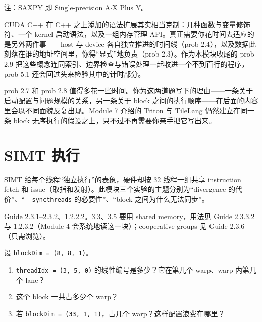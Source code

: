 \documentclass[11pt,a4paper,fontset=none]{ctexart}
\begin{document}
注：SAXPY 即 Single-precision A$\cdot$X Plus Y。

\begin{lookback}
CUDA C++ 在 C++ 之上添加的语法扩展其实相当克制：几种函数与变量修饰符、一个 kernel 启动语法，以及一组内存管理 API。真正需要你花时间去适应的是另外两件事——host 与 device 各自独立推进的时间线（prob 2.4），以及数据此刻落在谁的地址空间里，你得“显式”地负责（prob 2.3）。作为本模块收尾的 prob 2.9 把这些概念连同索引、边界检查与错误处理一起收进一个不到百行的程序，prob 5.1 还会回过头来检验其中的计时部分。

prob 2.7 和 prob 2.8 值得多花一些时间。你为这两道题写下的理由——一条关于启动配置与问题规模的关系，另一条关于 block 之间的执行顺序——在后面的内容里会以不同面貌反复出现。Module 7 介绍的 Triton 与 TileLang 仍然建立在同一条 block 无序执行的假设之上，只不过不再需要你亲手把它写出来。
\end{lookback}

\section{SIMT 执行}

SIMT 给每个线程“独立执行”的表象，硬件却按 32 线程一组共享 instruction fetch 和 issue（取指和发射）。此模块三个实验的主题分别为“divergence 的代价”、“\texttt{\_\_syncthreads} 的必要性”、“block 之间为什么无法同步”。

\begin{reading}
Guide 2.3.1--2.3.2、1.2.2.2。3.3、3.5 要用 shared memory，用法见 Guide 2.3.3.2 与 1.2.3.2（Module 4 会系统地读这一块）；cooperative groups 见 Guide 2.3.6（只需浏览）。
\end{reading}

设 \texttt{blockDim = (8, 8, 1)}。
\begin{enumerate}[label=(\alph*)]
  \item \texttt{threadIdx = (3, 5, 0)} 的线性编号是多少？它在第几个 warp、warp 内第几个 lane？
  \item 这个 block 一共占多少个 warp？
  \item 若 \texttt{blockDim = (33, 1, 1)}，占几个 warp？这样配置浪费在哪里？
\end{enumerate}
\end{document}
